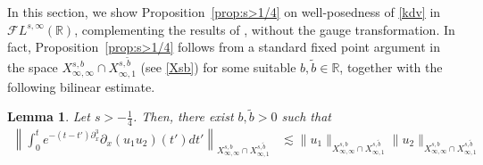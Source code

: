 \documentclass[%
11pt,  reqno]{amsart}
\newcommand{\5}{\textup{V}}
\newcommand{\FL}{\mathcal{F} L}
\newcommand{\les}{\lesssim}
\newcommand{\wt}{\widetilde}
\newtheorem{lemma}[theorem]{Lemma}
\theoremstyle{remark}
\newcommand{\R}{\mathbb{R}}
\numberwithin{equation}{section}
\numberwithin{theorem}{section}
\begin{document}
In this section, we show Proposition~\ref{prop:s>1/4} on well-posedness of \eqref{kdv}
 in $\FL^{s, \infty}(\R)$, complementing the results of \cite{Grunrock_ldv_hier}, without the gauge transformation. 
In fact, Proposition~\ref{prop:s>1/4} follows from a standard fixed point argument in the space $X^{s, b}_{\infty, \infty} \cap X^{s, \wt b }_{\infty, 1}$ (see \eqref{Xsb}) for some  suitable $b,\wt b\in \R$,
together with the following bilinear estimate. 



\begin{lemma}\label{LEM:bil0}
Let $s>-\frac14$. Then, there exist $b,\wt b >0 $ 
 such that 
\begin{align}
\label{bilinear0}
\left\|\int_0^te^{-(t-t')\partial_x^3}\partial_x(u_1u_2) (t')dt' \right\|_{X^{s,b}_{\infty, \infty}\cap X^{s,\tilde{b}}_{\infty, 1} } & \les 
\|u_1\|_{X^{s,b}_{\infty, \infty}\cap X^{s,\tilde{b}}_{\infty, 1} }
\|u_2\|_{X^{s,b}_{\infty, \infty}\cap X^{s,\tilde{b}}_{\infty, 1} }
\end{align}
\end{lemma}
\end{document}
